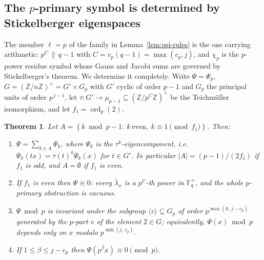 \documentclass[a4paper]{article}
\newtheorem{theorem}{Theorem}[section]
\newcommand{\F}{\mathbb{F}}
\newcommand{\Z}{\mathbb{Z}}
\newcommand{\ord}[2][]{\operatorname{ord}_{#1}\!\left(#2\right)}
\newcommand{\abs}[1]{\left|#1\right|}
\begin{document}
\subsection{The $p$-primary symbol is determined by Stickelberger
eigenspaces}

The member $\ell=p$ of the family in Lemma~\ref{lem:psi-rules} is the one
carrying arithmetic: $p^{C}\,\|\,q-1$ with
$C=v_p(q-1)=\max(c_p,j)$, and $\chi_p$ is the $p$-power residue symbol whose
Gauss and Jacobi sums are governed by Stickelberger's theorem.  We determine
it completely.  Write $\Psi=\Psi_p$, $G=(\Z/n\Z)^{\times}=G'\times G_p$ with
$G'$ cyclic of order $p-1$ and $G_p$ the principal units of order
$p^{\,j-1}$, let $\tau:G'\to\mu_{p-1}\subseteq(\Z/p^{C}\Z)^{\times}$ be the
Teichmüller isomorphism, and let $f_1=\ord[p]{2}$.

\begin{theorem}\label{thm:pstructure}
	Let $A=\left\{k\bmod p-1:\ k\ \text{even},\ k\equiv1\pmod{f_1}\right\}$.
	Then:
	\begin{enumerate}
		\item $\Psi=\sum_{k\in A}\Psi_k$, where $\Psi_k$ is the
		      $\tau^{k}$-eigencomponent, i.e.\
		      $\Psi_k(tx)=\tau(t)^{k}\Psi_k(x)$ for $t\in G'$.
		      In particular $\abs{A}=(p-1)/(2f_1)$ if $f_1$ is odd, and
		      $A=\emptyset$ if $f_1$ is even.
		\item If $f_1$ is even then $\Psi\equiv0$: every $\bar\lambda_x$
		      is a $p^{C}$-th power in $\F_q^{\times}$, and the whole
		      $p$-primary obstruction is vacuous.
		\item $\Psi\bmod p$ is invariant under the subgroup
		      $\langle v\rangle\subseteq G_p$ of order
		      $p^{\max(0,\,j-c_p)}$ generated by the $p$-part $v$ of the
		      element $2\in G$; equivalently, $\Psi(x)\bmod p$ depends
		      only on $x$ modulo $p^{\min(j,\,c_p)}$.
		\item If $1\leq\beta\leq j-c_p$ then $\Psi(p^{\beta}x)\equiv0
		      \pmod p$.
	\end{enumerate}
\end{theorem}
\end{document}
